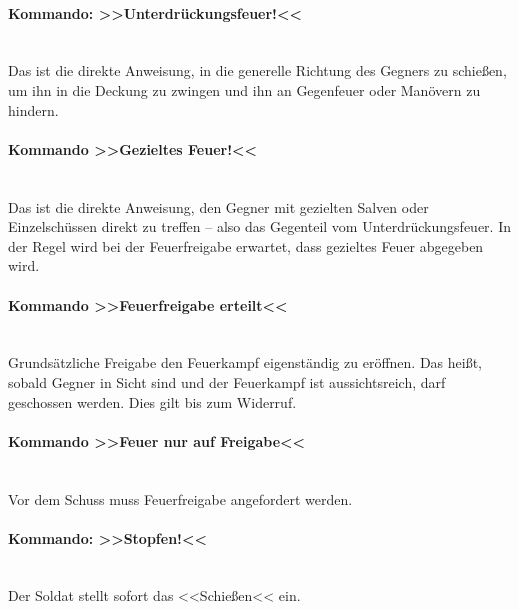 \paragraph*{Kommando: >>Unterdrückungsfeuer!<<}\hfil\\
	Das ist die direkte Anweisung, in die generelle Richtung des Gegners zu schießen, um ihn in die Deckung zu zwingen und ihn an Gegenfeuer oder Manövern zu hindern.

\paragraph*{Kommando >>Gezieltes Feuer!<<}\hfil\\
	Das ist die direkte Anweisung, den Gegner mit gezielten Salven oder Einzelschüssen direkt zu treffen -- also das Gegenteil vom Unterdrückungsfeuer. In der Regel wird bei der Feuerfreigabe erwartet, dass gezieltes Feuer abgegeben wird.

\paragraph*{Kommando >>Feuerfreigabe erteilt<<}\hfil\\
	Grundsätzliche Freigabe den Feuerkampf eigenständig zu eröffnen. Das heißt, sobald Gegner in Sicht sind und der Feuerkampf ist aussichtsreich, darf geschossen werden. Dies gilt bis zum Widerruf.

\paragraph*{Kommando >>Feuer nur auf Freigabe<<}\hfil\\
	Vor dem Schuss muss Feuerfreigabe angefordert werden.

\paragraph*{Kommando: >>Stopfen!<<}\hfil\\
	Der Soldat stellt sofort das <<Schießen<< ein.

